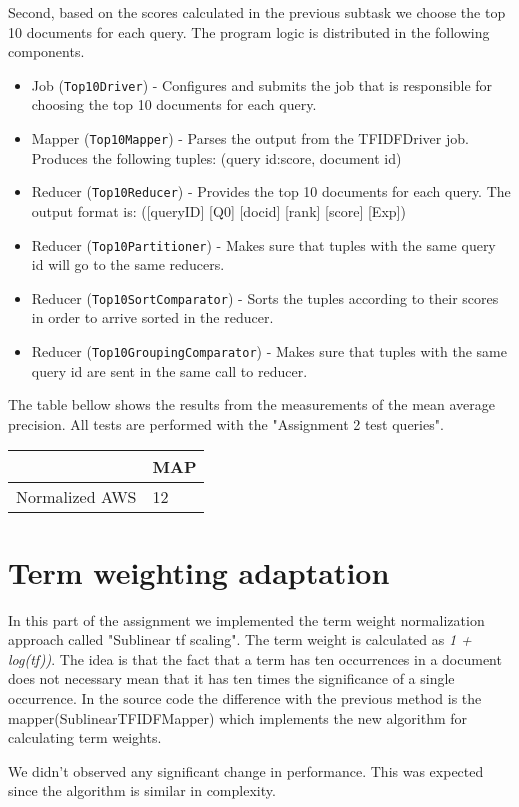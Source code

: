 \documentclass[a4paper, notitlepage]{article}
\begin{document}
Second, based on the scores calculated in the previous subtask we choose the top 10 documents for each query. The program logic is distributed in the following components.

\begin{itemize}
	\item Job (\lstinline{Top10Driver}) - Configures and submits the job that is responsible for choosing the top 10 documents for each query.
	\item Mapper (\lstinline{Top10Mapper}) - Parses the output from the TFIDFDriver job. Produces the following tuples: (query id:score, document id)
	\item Reducer (\lstinline{Top10Reducer}) - Provides the top 10 documents for each query. The output format is: ([queryID] [Q0] [docid] [rank] [score] [Exp])
  
	\item Reducer (\lstinline{Top10Partitioner}) - Makes sure that tuples with the same query id will go to the same reducers.
	
	\item Reducer (\lstinline{Top10SortComparator}) - Sorts the tuples according to their scores in order to arrive sorted in the reducer.
	
	\item Reducer (\lstinline{Top10GroupingComparator}) - Makes sure that tuples with the same query id are sent in the same call to reducer.
	
\end{itemize}

The table bellow shows the results from the measurements of the mean average precision. All tests are performed with the "Assignment 2 test queries".
\begin{center}
	\begin{tabular}{ | l | l | }
    	\hline
     & MAP\\ \hline
    Normalized AWS & 12  \\ \hline
    \hline
    \end{tabular}
\end{center}

\section{Term weighting adaptation}
In this part of the assignment we implemented the term weight normalization approach called "Sublinear tf scaling". The term weight is calculated as \emph{1 + log(tf))}. The idea is that the fact that a term has ten occurrences in a document does not necessary mean that it has ten times the significance of a single occurrence. In the source code the difference with the previous method is the mapper(SublinearTFIDFMapper) which implements the new algorithm for calculating term weights.

We didn't observed any significant change in performance. This was expected since the algorithm is similar in complexity.
\end{document}
